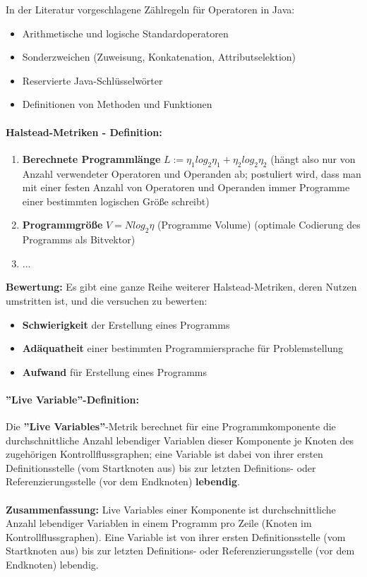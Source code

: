 In der Literatur vorgeschlagene Zählregeln für Operatoren in Java:
\begin{itemize}
	\item Arithmetische und logische Standardoperatoren
	\item Sonderzweichen (Zuweisung, Konkatenation, Attributselektion)
	\item Reservierte Java-Schlüsselwörter
	\item Definitionen von Methoden und Funktionen
\end{itemize}

\paragraph{Halstead-Metriken - Definition:}
\begin{enumerate}
	\item \textbf{Berechnete Programmlänge} $L := \eta_{1}log_{2}\eta_{1} + \eta_{2}log_{2}\eta_{2}$ (hängt also nur von Anzahl verwendeter Operatoren und Operanden ab; postuliert wird, dass man  mit einer festen Anzahl von Operatoren und Operanden immer Programme einer bestimmten logischen Größe schreibt)
	\item \textbf{Programmgröße} $V=N log_{2} \eta$ (Programme Volume) (optimale Codierung des Programms als Bitvektor)
	\item ...
\end{enumerate}

\textbf{Bewertung:} Es gibt eine ganze Reihe weiterer Halstead-Metriken, deren Nutzen umstritten ist, und die versuchen zu bewerten:
\begin{itemize}
	\item \textbf{Schwierigkeit} der Erstellung eines Programms
	\item \textbf{Adäquatheit} einer bestimmten Programmiersprache für Problemstellung
	\item \textbf{Aufwand} für Erstellung eines Programms
\end{itemize}

\paragraph{''Live Variable''-Definition:}
Die \textbf{''Live Variables''}-Metrik berechnet für eine Programmkomponente die durchschnittliche Anzahl lebendiger Variablen dieser Komponente je Knoten des zugehörigen Kontrollflussgraphen; eine Variable ist dabei von ihrer ersten Definitionsstelle (vom Startknoten aus) bis zur letzten Definitions- oder Referenzierungsstelle (vor dem Endknoten) \textbf{lebendig}. 
\\
\\
\textbf{Zusammenfassung:} Live Variables einer Komponente ist durchschnittliche Anzahl lebendiger Variablen in einem Programm pro Zeile (Knoten im Kontrollflussgraphen). Eine Variable ist von ihrer ersten Definitionsstelle (vom Startknoten aus) bis zur letzten Definitions- oder Referenzierungsstelle (vor dem Endknoten) lebendig.

